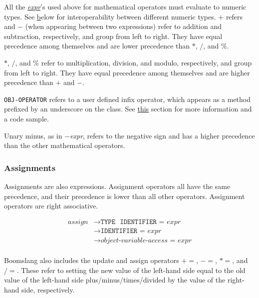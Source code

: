 \documentclass{article}
\begin{document}
All the \hyperref[sec:expr]{\textit{expr}}'s used above for mathematical operators must evaluate to numeric types. See \hyperref[sec:conversions] below for interoperability between different numeric types. \(+\) refers and \(-\) (when appearing between two expressions) refer to addition and subtraction, respectively, and group from left to right. They have equal precedence among themselves and are lower precedence than \(*\), \(/\), and \(\%\).

\(*\), \(/\), and \(\%\) refer to multiplication, division, and modulo, respectively, and group from left to right. They have equal precedence among themselves and are higher precedence than \(+\) and \(-\).

\texttt{OBJ-OPERATOR} refers to a user defined infix operator, which appears as a method prefixed by an underscore on the class. See \hyperref[sec:object-operators]{this} section for more information and a code sample.

Unary minus, as in \(-\)\textit{expr}, refers to the negative sign and has a higher precedence than the other mathematical operators.

\subsubsection{Assignments}
Assignments are also expressions. Assignment operators all have the same precedence, and their precedence is lower than all other operators. Assignment operators are right associative.

\label{sec:assign}
\begin{align*}
    \textit{assign} &\to \texttt{TYPE} \text{ }  \texttt{IDENTIFIER} \texttt{ = } \hyperref[sec:expr]{\textit{expr}} \\
    &\to \texttt{IDENTIFIER} \texttt{ = } \hyperref[sec:expr]{\textit{expr}} \\
    &\to \hyperref[sec:object-variable-access]{\textit{object-variable-access}} \texttt{ = } \hyperref[sec:expr]{\textit{expr}} \\
\end{align*}

Boomslang also includes the update and assign operators \(+=\), \(-=\), \(*=\), and \(/=\). These refer to setting the new value of the left-hand side equal to the old value of the left-hand side plus/minus/times/divided by the value of the right-hand side, respectively.
\end{document}
